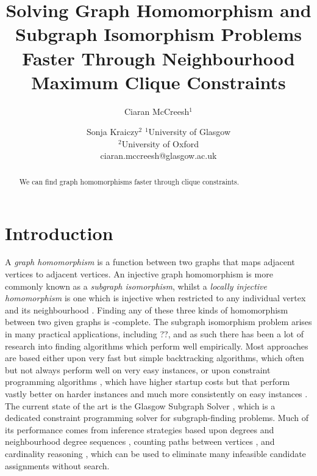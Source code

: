 \documentclass{article}
\title{Solving Graph Homomorphism and Subgraph Isomorphism Problems Faster Through Neighbourhood
Maximum Clique Constraints}
\author{
Ciaran McCreesh$^1$
\and
Sonja Kraiczy$^2$
\affiliations
$^1$University of Glasgow\\
$^2$University of Oxford\\
\emails
ciaran.mccreesh@glasgow.ac.uk
}
\begin{document}
\maketitle

\begin{abstract}
    We can find graph homomorphisms faster through clique constraints.
\end{abstract}

\section{Introduction}

A \emph{graph homomorphism} is a function between two graphs that maps adjacent vertices to adjacent
vertices. An injective graph homomorphism is more commonly known as a \emph{subgraph isomorphism},
whilst a \emph{locally injective homomorphism} is one which is injective when restricted to any
individual vertex and its neighbourhood \cite{DBLP:journals/csr/FialaK08}. Finding any of these three kinds of homomorphism between
two given graphs is \NP-complete.  The subgraph isomorphism problem arises in many practical
applications, including ??, and as such there has been a lot of research into finding algorithms
which perform well empirically. Most approaches are based either upon very fast but simple
backtracking algorithms,
\cite{DBLP:journals/pami/CordellaFSV04,DBLP:journals/bmcbi/BonniciGPSF13,DBLP:conf/gbrpr/CarlettiFSV17}
which often but not always perform well on very easy instances, or upon constraint programming
algorithms
\cite{DBLP:journals/constraints/ZampelliDS10,DBLP:journals/ai/Solnon10,DBLP:conf/cp/AudemardLMGP14,DBLP:conf/cp/McCreeshP15,DBLP:conf/cpaior/ArchibaldDHMP019},
which have higher startup costs but that perform vastly better on harder instances and much more
consistently on easy instances \cite{DBLP:journals/jair/McCreeshPST18,DBLP:conf/gbrpr/Solnon19}. The
current state of the art is the Glasgow Subgraph Solver \cite{DBLP:conf/gg/McCreeshP020}, which is a
dedicated constraint programming solver for subgraph-finding problems. Much of its performance comes
from inference strategies based upon degrees and neighbourhood degree sequences
\cite{DBLP:journals/constraints/ZampelliDS10}, counting paths between vertices
\cite{DBLP:conf/cp/AudemardLMGP14,DBLP:conf/cp/McCreeshP15}, and cardinality reasoning
\cite{DBLP:journals/ai/Solnon10}, which can be used to eliminate many infeasible candidate
assignments without search.
\end{document}
